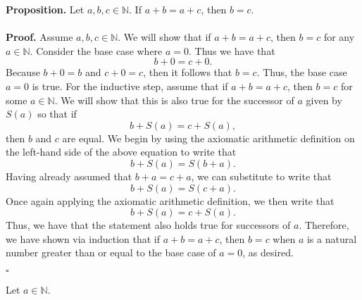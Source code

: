\documentclass[12pt]{exam}
\begin{document}
\begin{questions}


\question
\textbf{Proposition.}  Let $a, b, c \in \mathbb{N}$.  If $a+b = a+c$, then $b=c$. 
\\
\\\textbf{Proof.} Assume $a,b,c \in \mathbb N$. We will show that if $a+b = a+c$, then $b=c$ for any $a \in \mathbb N$. Consider the base case where $a=0$. Thus we have that $$b+0=c+0.$$ Because $b+0 = b$ and $c+0=c$, then it follows that $b=c$. Thus, the base case $a=0$ is true. For the inductive step, assume that if $a+b = a+c$, then $b=c$ for some $a \in \mathbb N$. We will show that this is also true for the successor of $a$ given by $S(a)$ so that if $$b+ S(a) = c + S(a),$$ then $b$ and $c$ are equal. We begin by using the axiomatic arithmetic definition on the left-hand side of the above equation to write that $$b + S(a) = S(b+a). $$ Having already assumed that $b + a = c + a$, we can substitute to write that $$b + S(a) = S(c+a). $$ Once again applying the axiomatic arithmetic definition, we then write that  $$b + S(a) = c +S(a). $$ Thus, we have that the statement also holds true for successors of $a$. Therefore, we have shown via induction that if $a+b = a+c$, then $b=c$ when $a$ is a natural number greater than or equal to the base case of $a=0$, as desired.
\begin{flushright}
$\square$
\end{flushright}

\question
Let $a \in \mathbb{N}$. 
\end{questions}
\end{document}
